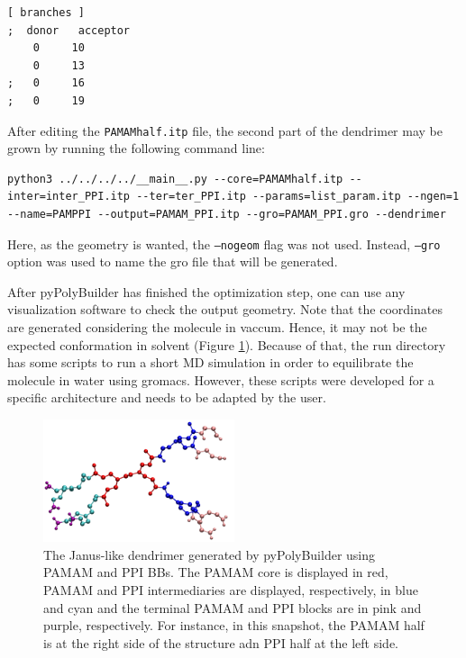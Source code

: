 \begin{lstlisting}
[ branches ]
;  donor   acceptor
    0     10
    0     13
;   0     16
;   0     19
\end{lstlisting}

After editing the \texttt{PAMAMhalf.itp} file, the second part of the dendrimer may be grown by running the following command line:

\begin{lstlisting}
python3 ../../../../__main__.py --core=PAMAMhalf.itp --inter=inter_PPI.itp --ter=ter_PPI.itp --params=list_param.itp --ngen=1 --name=PAMPPI --output=PAMAM_PPI.itp --gro=PAMAM_PPI.gro --dendrimer
\end{lstlisting}

Here, as the geometry is wanted, the \texttt{--nogeom} flag was not used.
Instead, \texttt{--gro} option was used to name the gro file that will be generated.

After pyPolyBuilder has finished the optimization step, one can use any visualization software to check the output geometry. 
Note that the coordinates are generated considering the molecule in vaccum.
Hence, it may not be the expected conformation in solvent (Figure \ref{fig:JanusPPB}).
Because of that, the run directory has some scripts to run a short MD simulation in order to equilibrate the molecule in water using gromacs.
However, these scripts were developed for a specific architecture and needs to be adapted by the user.

\begin{figure}
    \centering
    \includegraphics[width=0.5\textwidth]{PAMAM_PPI-Janus/PAMAM_PPI.pdf}
    \caption{The Janus-like dendrimer generated by pyPolyBuilder using PAMAM and PPI BBs. The PAMAM core is displayed in red, PAMAM and PPI intermediaries are displayed, respectively, in blue and cyan and the terminal PAMAM and PPI blocks are in pink and purple, respectively.
    For instance, in this snapshot, the PAMAM half is at the right side of the structure adn PPI half at the left side.}
    \label{fig:JanusPPB}
\end{figure}

